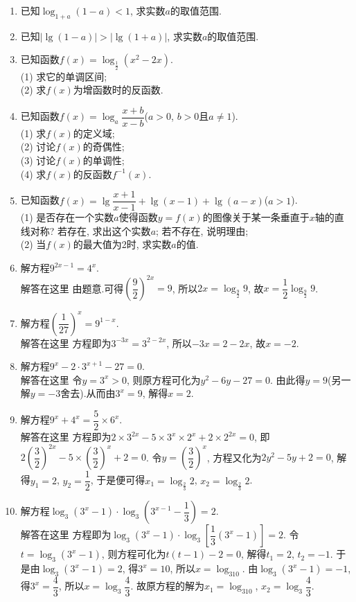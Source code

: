 \documentclass[10pt,a4paper]{article}
\begin{document}
\begin{enumerate}[1.]
\item 已知$\log_{1+a}(1-a)<1$, 求实数$a$的取值范围.
\item 已知$|\lg (1-a)|>|\lg (1+a)|$, 求实数$a$的取值范围.
\item 已知函数$f(x)=\log_{\frac 12}(x^2-2x)$.\\
(1) 求它的单调区间;\\
(2) 求$f(x)$为增函数时的反函数.
\item 已知函数$f(x)=\log_a\dfrac{x+b}{x-b}$($a>0$, $b>0$且$a\ne 1$).\\
(1) 求$f(x)$的定义域;\\
(2) 讨论$f(x)$的奇偶性;\\
(3) 讨论$f(x)$的单调性;\\
(4) 求$f(x)$的反函数$f^{-1}(x)$.
\item 已知函数$f(x)=\lg \dfrac{x+1}{x-1}+\lg (x-1)+\lg (a-x)$($a>1$).\\
(1) 是否存在一个实数$a$使得函数$y=f(x)$的图像关于某一条垂直于$x$轴的直线对称? 若存在, 求出这个实数$a$; 若不存在, 说明理由;\\
(2) 当$f(x)$的最大值为2时, 求实数$a$的值.
\item 解方程$9^{2x-1}=4^x$.\\
解答在这里  由题意.可得$(\dfrac 92)^{2x}=9$, 所以$ 2x=\log_{\frac 92}9$, 故$x=\dfrac 12\log_{\frac 92}9$.
\item 解方程$(\dfrac 1{27})^x=9^{1-x}$.\\
解答在这里  方程即为$3^{-3x}=3^{2-2x}$, 所以$ -3x=2-2x$, 故$x=-2$.
\item 解方程$9^x-2\cdot 3^{x+1}-27=0$.\\
解答在这里  令$y=3^x>0$, 则原方程可化为$y^2-6y-27=0$.
由此得$y=9$(另一解$y=-3$舍去).从而由$3^x=9$, 解得$x=2$.
\item 解方程$9^x+4^x=\dfrac 52\times 6^x$.\\
解答在这里 方程即为$2\times 3^{2x}-5\times 3^x\times 2^x+2\times 2^{2x}=0$, 即$2(\dfrac 32)^{2x}-5\times (\dfrac 32)^x+2=0$.
令$y=(\dfrac 32)^x$, 方程又化为$2y^2-5y+2=0$, 解得$y_1=2$, $y_2=\dfrac 12$,
于是便可得$x_1=\log_{\frac 23}2$, $x_2=\log_{\frac 23}2$.
\item 解方程$\log_3(3^x-1)\cdot \log_3(3^{x-1}-\dfrac 13)=2$.\\
解答在这里  方程即为$\log_3(3^x-1)\cdot \log_3[\dfrac 13(3^x-1)]=2$.
令$t=\log_3(3^x-1)$, 则方程可化为$t(t-1)-2=0$, 解得$t_1=2$, $t_2=-1$.
于是由$\log_3(3^x-1)=2$, 得$3^x=10$, 所以$ x=\log_310$.
由$\log_3(3^x-1)=-1$, 得$3^x=\dfrac 43$, 所以$ x=\log_3\dfrac 43$.
故原方程的解为$x_1=\log_310$, $x_2=\log_3\dfrac 43$.

\end{enumerate}
\end{document}
